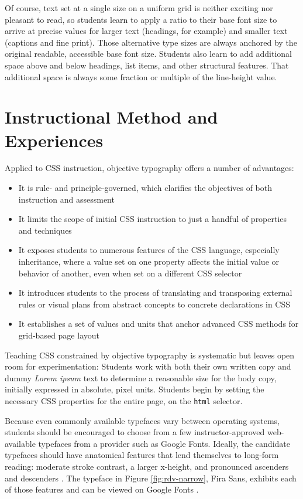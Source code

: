 \documentclass[sigplan,screen]{acmart}
\begin{document}
Of course, text set at a single size on a uniform grid is neither exciting nor pleasant to read, so students learn to apply a ratio to their base font size to arrive at precise values for larger text (headings, for example) and smaller text (captions and fine print). Those alternative type sizes are always anchored by the original readable, accessible base font size. Students also learn to add additional space above and below headings, list items, and other structural features. That additional space is always some fraction or multiple of the line-height value.

\section{Instructional Method and Experiences}

Applied to CSS instruction, objective typography offers a number of advantages:

\begin{itemize}
  \item It is rule- and principle-governed, which clarifies the objectives of both instruction and assessment
  \item It limits the scope of initial CSS instruction to just a handful of properties and techniques
  \item It exposes students to numerous features of the CSS language, especially inheritance, where a value set on one property affects the initial value or behavior of another, even when set on a different CSS selector
  \item It introduces students to the process of translating and transposing external rules or visual plans from abstract concepts to concrete declarations in CSS
  \item It establishes a set of values and units that anchor advanced CSS methods for grid-based page layout
\end{itemize}

Teaching CSS constrained by objective typography is systematic but leaves open room for experimentation: Students work with both their own written copy and dummy {\itshape Lorem ipsum} text to determine a reasonable size for the body copy, initially expressed in absolute, pixel units. Students begin by setting the necessary CSS properties for the entire page, on the \verb|html| selector.

Because even commonly available typefaces vary between operating systems, students should be encouraged to choose from a few instructor-approved web-available typefaces from a provider such as Google Fonts. Ideally, the candidate typefaces should have anatomical features that lend themselves to long-form reading: moderate stroke contrast, a larger x-height, and pronounced ascenders and descenders \cite[p.~36]{jsm:owt}. The typeface in Figure \ref{fig:rdv-narrow}, Fira Sans, exhibits each of those features and can be viewed on Google Fonts \cite{gf:fs}.
\end{document}
